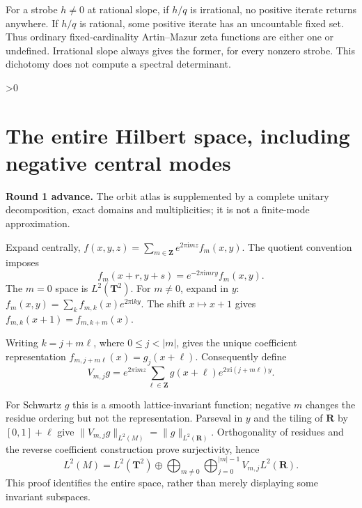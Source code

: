 \documentclass[10pt]{article}
\newcommand{\R}{\mathbf R}
\newcommand{\Z}{\mathbf Z}
\newcommand{\T}{\mathbf T}
\newcommand{\ii}{\mathrm i}
\begin{document}
For a strobe $h\ne0$ at rational slope, if $h/q$ is irrational, no positive
iterate returns anywhere. If $h/q$ is rational, some positive iterate has
an uncountable fixed set. Thus ordinary fixed-cardinality Artin--Mazur
zeta functions are either one or undefined. Irrational slope always gives
the former, for every nonzero strobe. This dichotomy does not compute a
spectral determinant.

\ifnum\CRevisionRound>0
\section{The entire Hilbert space, including negative central modes}
\noindent\textbf{Round 1 advance.}
The orbit atlas is supplemented by a complete unitary decomposition,
exact domains and multiplicities; it is not a finite-mode approximation.

Expand centrally,
$f(x,y,z)=\sum_{m\in\Z}e^{2\pi\ii mz}f_m(x,y)$.
The quotient convention imposes
\[
 f_m(x+r,y+s)=e^{-2\pi\ii mry}f_m(x,y).
\]
The $m=0$ space is $L^2(\T^2)$. For $m\ne0$, expand in $y$:
$f_m(x,y)=\sum_k f_{m,k}(x)e^{2\pi\ii ky}$.
The shift $x\mapsto x+1$ gives $f_{m,k}(x+1)=f_{m,k+m}(x)$.
\par\begin{samepage}\noindent
Writing $k=j+m\ell$, where $0\le j<|m|$, gives the unique coefficient
representation $f_{m,j+m\ell}(x)=g_j(x+\ell)$. Consequently define
\[
 V_{m,j}g=e^{2\pi\ii mz}
 \sum_{\ell\in\Z}g(x+\ell)e^{2\pi\ii(j+m\ell)y}.
\]
\end{samepage}
For Schwartz $g$ this is a smooth lattice-invariant function; negative
$m$ changes the residue ordering but not the representation. Parseval in
$y$ and the tiling of $\R$ by $[0,1]+\ell$ give
$\|V_{m,j}g\|_{L^2(M)}=\|g\|_{L^2(\R)}$. Orthogonality of residues and
the reverse coefficient construction prove surjectivity, hence
\begin{equation}
 L^2(M)=L^2(\T^2)\oplus
 \bigoplus_{m\ne0}\bigoplus_{j=0}^{|m|-1}V_{m,j}L^2(\R).\label{decomp}
\end{equation}
This proof identifies the entire space, rather than merely displaying
some invariant subspaces.
\end{document}
